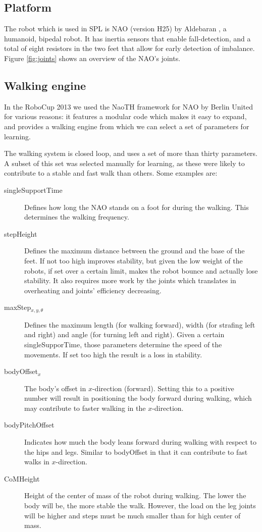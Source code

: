 \documentclass{article}
\begin{document}
\subsection{Platform}
The robot which is used in SPL is NAO (version H25) by Aldebaran
\cite{gouaillier2009mechatronic}, a humanoid, bipedal robot. It has inertia
sensors that enable fall-detection, and a total of eight resistors in the two
feet that allow for early detection of imbalance. Figure
\ref{fig:joints} shows an overview of the NAO's joints.

\subsection{Walking engine}
In the RoboCup 2013 we used the NaoTH framework for NAO by Berlin United
\cite{naothdescription} for various reasons: it features a modular code which
makes it easy to expand, and provides a walking engine from which we can select
a set of parameters for learning. 

The walking system is closed loop, and uses a set of more than thirty parameters. A subset of this set was selected manually for learning, as these were likely to contribute to a stable and fast walk than others.
Some examples are:
\begin{description}
\item[singleSupportTime] Defines how long the NAO stands on a foot for during the walking. This determines the walking frequency.
\item[stepHeight] Defines the maximum distance between the ground and the base of the feet. If not too high improves stability, but given the low weight of the robots, if set over a certain limit, makes the robot bounce and actually lose stability. It also requires more work by the joints which translates in overheating and joints' efficiency decreasing. 
\item[maxStep$_{x,y, \theta }$] Defines the maximum length (for walking forward), width (for strafing left and right) and angle (for turning left and right). Given a certain singleSupporTime, those parameters determine the speed of the movements. If set too high the result is a loss in stability.
\item[bodyOffset$_{x}$] The body's offset in $x$-direction (forward). Setting this to a positive number will result in positioning the body forward during walking, which may contribute to faster walking in the $x$-direction.
\item[bodyPitchOffset] Indicates how much the body leans forward during walking with respect to the hips and legs. Similar to bodyOffset in that it can contribute to fast walks in $x$-direction. 
\item[CoMHeight] Height of the center of mass of the robot during walking. The lower the body will be, the more stable the walk. However, the load on the leg joints will be higher and steps must be much smaller than for high center of mass. 
\end{description}
\end{document}
